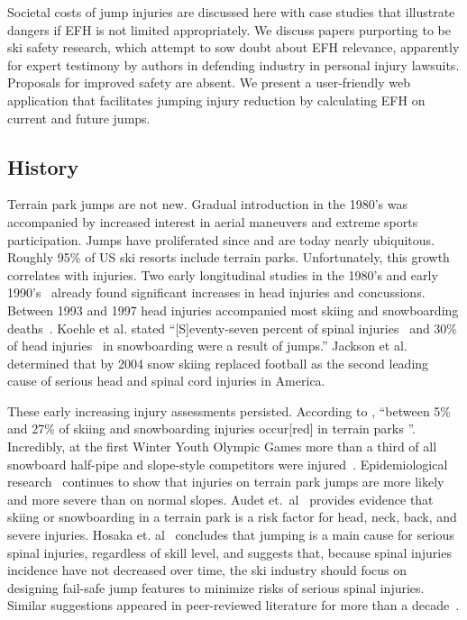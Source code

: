 \documentclass[smallextended]{svjour3}       %
\begin{document}
Societal costs of jump injuries are discussed here with case studies that
illustrate dangers if EFH is not limited appropriately. We discuss papers
purporting to be ski safety research, which attempt to sow doubt about EFH
relevance, apparently for expert testimony by authors in defending industry in
personal injury lawsuits. Proposals for improved safety are absent. We  present
a user-friendly web application that facilitates jumping injury reduction by
calculating EFH on current and future jumps.

\subsection{History}
\label{sec:hist}
%
Terrain park jumps are not new. Gradual introduction in the 1980's was
accompanied by increased interest in aerial maneuvers and extreme sports
participation.  Jumps have proliferated since and are today nearly ubiquitous.
Roughly 95\% of US ski resorts include terrain parks. Unfortunately, this
growth correlates with injuries. Two early longitudinal studies in the 1980's
and early 1990's~\cite{Deibert1998,Furrer1995} already found significant
increases in head injuries and concussions. Between 1993 and 1997 head injuries
accompanied most skiing and snowboarding deaths~\cite{CPSC1999}. Koehle et al.
\cite{Koehle2002} stated ``[S]eventy-seven percent of spinal
injuries~\cite{Tarazi1999} and 30\% of head injuries~\cite{Fukuda2001} in
snowboarding were a result of jumps.'' Jackson et al.~\cite{Jackson2004}
determined that by 2004 snow skiing replaced football as the second leading
cause of serious head and spinal cord injuries in America.

These early increasing injury assessments persisted. According to
\cite{Russell2014}, ``between 5\% and 27\% of skiing and snowboarding injuries
occur[red] in terrain parks
\cite{Bridges2003,Goulet2007,Moffat2009,Greve2009,Brooks2010,Ruedl2013}''.
Incredibly, at the first Winter Youth Olympic Games more than a third of all
snowboard half-pipe and slope-style competitors were injured~\cite{Ruedl2012}.
Epidemiological research~\cite{Carus2016,Audet2020,Hosaka2020} continues to
show that injuries on terrain park jumps are more likely and more severe than
on normal slopes. Audet et.~al~\cite{Audet2020} provides evidence that skiing
or snowboarding in a terrain park is a risk factor for head, neck, back, and
severe injuries. Hosaka et. al~\cite{Hosaka2020} concludes that jumping is a
main cause for serious spinal injuries, regardless of skill level, and suggests
that, because spinal injuries incidence  have not decreased over time,  the ski
industry should focus on designing fail-safe jump features to minimize risks of
serious spinal injuries. Similar suggestions appeared in peer-reviewed literature
for more than a
decade~\cite{Hubbard2009,Swedberg2012,McNeil2012,McNeil2012a,Hubbard2015,Levy2015,Petrone2017,Moore2018}.
\end{document}
